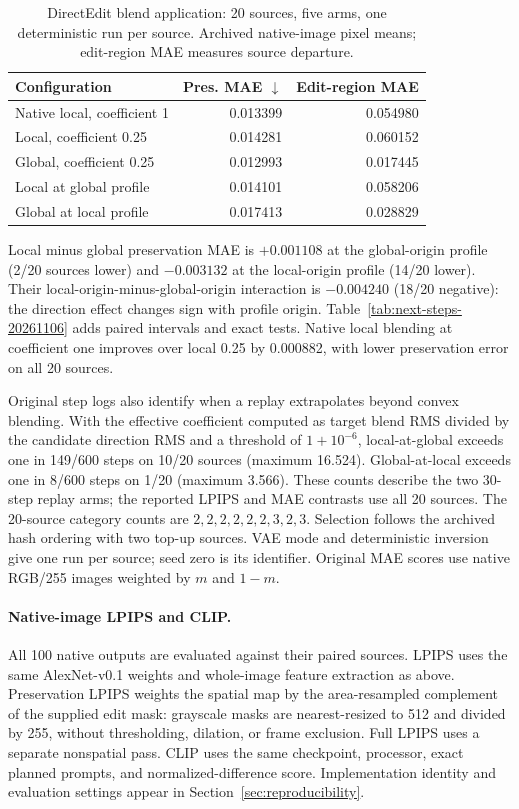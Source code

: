 \documentclass[10pt,doubleanonymous]{ieeeconf}
\begin{document}
\begin{table}[!t]
\centering\small
\caption{DirectEdit blend application: 20 sources, five arms, one deterministic run per source. Archived native-image pixel means; edit-region MAE measures source departure.}
\label{tab:directedit}
\begin{tabular}{lrr}
\toprule
Configuration & Pres. MAE $\downarrow$ & Edit-region MAE\\
\midrule
Native local, coefficient 1 &0.013399&0.054980\\
Local, coefficient 0.25 &0.014281&0.060152\\
Global, coefficient 0.25 &0.012993&0.017445\\
Local at global profile &0.014101&0.058206\\
Global at local profile &0.017413&0.028829\\
\bottomrule
\end{tabular}
\end{table}

Local minus global preservation MAE is $+0.001108$ at the global-origin profile (2/20 sources lower) and $-0.003132$ at the local-origin profile (14/20 lower). Their local-origin-minus-global-origin interaction is $-0.004240$ (18/20 negative): the direction effect changes sign with profile origin. Table~\ref{tab:next-steps-20261106} adds paired intervals and exact tests. Native local blending at coefficient one improves over local 0.25 by 0.000882, with lower preservation error on all 20 sources.

Original step logs also identify when a replay extrapolates beyond convex blending. With the effective coefficient computed as target blend RMS divided by the candidate direction RMS and a threshold of $1+10^{-6}$, local-at-global exceeds one in 149/600 steps on 10/20 sources (maximum 16.524). Global-at-local exceeds one in 8/600 steps on 1/20 (maximum 3.566). These counts describe the two 30-step replay arms; the reported LPIPS and MAE contrasts use all 20 sources.
The 20-source category counts are $2,2,2,2,2,2,3,2,3$. Selection follows the archived hash ordering with two top-up sources. VAE mode and deterministic inversion give one run per source; seed zero is its identifier. Original MAE scores use native RGB/255 images weighted by $m$ and $1-m$.

\paragraph{Native-image LPIPS and CLIP.}
All 100 native outputs are evaluated against their paired sources. LPIPS uses the same AlexNet-v0.1 weights and whole-image feature extraction as above. Preservation LPIPS weights the spatial map by the area-resampled complement of the supplied edit mask: grayscale masks are nearest-resized to 512 and divided by 255, without thresholding, dilation, or frame exclusion. Full LPIPS uses a separate nonspatial pass. CLIP uses the same checkpoint, processor, exact planned prompts, and normalized-difference score. Implementation identity and evaluation settings appear in Section~\ref{sec:reproducibility}.
\end{document}
